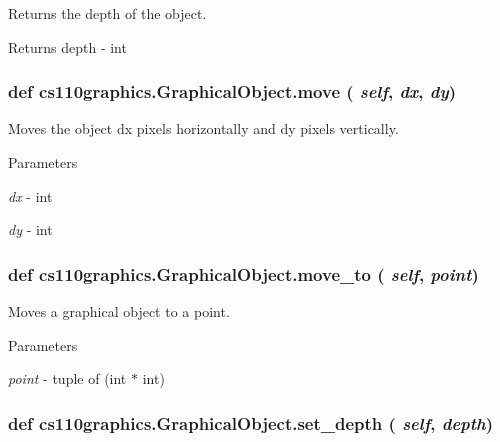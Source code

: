 Returns the depth of the object. \begin{DoxyReturn}{Returns}
depth -\/ int 
\end{DoxyReturn}
\hypertarget{classcs110graphics_1_1GraphicalObject_aa64d270fb83efa4a54e1a7953512f9cd}{
\subsubsection[{move}]{\setlength{\rightskip}{0pt plus 5cm}def cs110graphics.GraphicalObject.move ( {\em self}, \/   {\em dx}, \/   {\em dy})}}
\label{classcs110graphics_1_1GraphicalObject_aa64d270fb83efa4a54e1a7953512f9cd}


Moves the object dx pixels horizontally and dy pixels vertically. 
\begin{DoxyParams}{Parameters}
\item[{\em dx}]-\/ int \item[{\em dy}]-\/ int \end{DoxyParams}
\hypertarget{classcs110graphics_1_1GraphicalObject_abe2d480265df7ac9447205c52c6946df}{
\subsubsection[{move\_\-to}]{\setlength{\rightskip}{0pt plus 5cm}def cs110graphics.GraphicalObject.move\_\-to ( {\em self}, \/   {\em point})}}
\label{classcs110graphics_1_1GraphicalObject_abe2d480265df7ac9447205c52c6946df}


Moves a graphical object to a point. 
\begin{DoxyParams}{Parameters}
\item[{\em point}]-\/ tuple of (int $\ast$ int) \end{DoxyParams}
\hypertarget{classcs110graphics_1_1GraphicalObject_a20d76d4ee4419c3065d61deb6cbc6700}{
\subsubsection[{set\_\-depth}]{\setlength{\rightskip}{0pt plus 5cm}def cs110graphics.GraphicalObject.set\_\-depth ( {\em self}, \/   {\em depth})}}
\label{classcs110graphics_1_1GraphicalObject_a20d76d4ee4419c3065d61deb6cbc6700}



